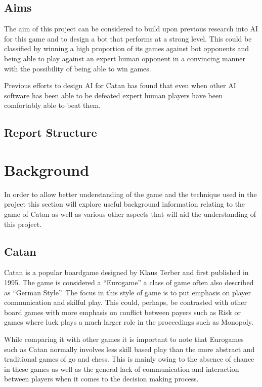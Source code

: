 \documentclass[]{article}
\let\oldsection\section
\renewcommand\section{\clearpage\oldsection}
\begin{document}
\subsection{Aims}
The aim of this project can be considered to build upon previous research into AI for this game and to design a bot that performs at a strong level. This could be classified by winning a high proportion of its games against bot opponents and being able to play against an expert human opponent in a convincing manner with the possibility of being able to win games.

\par Previous efforts to design AI for Catan has found that even when other AI software has been able to be defeated expert human players have been comfortably able to beat them.

\subsection{Report Structure}

\section{Background}
In order to allow better understanding of the game and the technique used in the project this section will explore useful background information relating to the game of Catan as well as various other aspects that will aid the understanding of this project.


\subsection{Catan}
Catan is a popular boardgame designed by Klaus Terber and first published in 1995. The game is considered a ``Eurogame'' a class of game often also described as ``German Style''. The focus in this style of game is to put emphasis on player communication and skilful play. This could, perhaps, be contrasted with other board games with more emphasis on conflict between payers such as Risk or games where luck plays a much larger role in the proceedings such as Monopoly. 

\par While comparing it with other games it is important to note that Eurogames such as Catan normally involves less skill based play than the more abstract and traditional games of go and chess. This is mainly owing to the absence of chance in these games as well as the general lack of communication and interaction between players when it comes to the decision making process.
\end{document}
